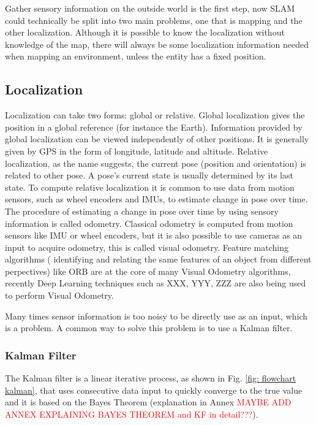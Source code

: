 Gather sensory information on the outside world is the first step, now \acs*{SLAM} could technically be split into two main problems, one that is mapping and the other localization. Although it is possible to know the localization without knowledge of the map, there will always be some localization information needed when mapping an environment, unless the entity has a fixed position.

\subsection{Localization}
Localization can take two forms: global or relative. 
Global localization gives the position in a global reference (for instance the Earth). Information provided by global localization can be viewed independently of other positions. It is generally given by \acs*{GPS} in the form of longitude, latitude and altitude.
Relative localization, as the name suggests, the current pose (position and orientation) is related to other pose. A pose's current state is usually determined by its last state. To compute relative localization it is common to use data from motion sensors, such as wheel encoders and \acs*{IMU}s, to estimate change in pose over time.
The procedure of estimating a change in pose over time by using sensory information is called odometry. Classical odometry is computed from motion sensors like \acs*{IMU} or wheel encoders, but it is also possible to use cameras as an input to acquire odometry, this is called visual odometry. Feature matching algorithms ( identifying and relating the same features of an object from different perpectives) like ORB \cite{rublee_orb_2011} are at the core of many Visual Odometry algorithms, recently Deep Learning techniques such as XXX, YYY, ZZZ are also being used to perform Visual Odometry.

Many times sensor information is too noisy to be directly use as an input, which is a problem. A common way to solve this problem is to use a Kalman filter.

\subsubsection{Kalman Filter}
The Kalman filter is a linear iterative process, as shown in Fig. \ref*{fig: flowchart kalman}, that uses consecutive data input to quickly converge to the true value and it is based on the Bayes Theorem (explanation in Annex \textcolor{red}{MAYBE ADD ANNEX EXPLAINING BAYES THEOREM and KF in detail???}). 


